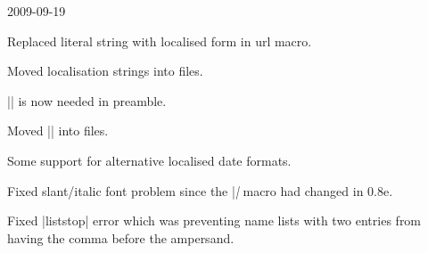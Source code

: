 \documentclass{ltxdockit}
\begin{document}
\begin{changelog}
\begin{release}{0.5}{2009-09-19}
\item Replaced literal string with localised form in url macro.
\item Moved localisation strings into  files.
\item |\DeclareLanguageMapping| is now needed in preamble.
\item Moved |\DeclareBibliographyExtras| into  files.
\item Some support for alternative localised date formats.
\item Fixed slant/italic font problem since the |\mkbibemph| macro had
  changed in  0.8e.
\item Fixed |liststop| error which was preventing name lists with two
  entries from having the comma before the ampersand.
\end{release}


\end{changelog}
\end{document}
